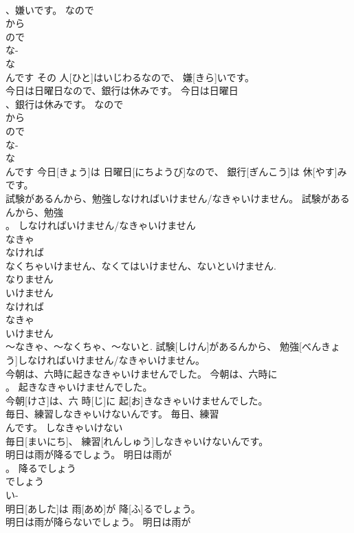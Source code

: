 \documentclass[8pt]{extreport}
\begin{document}
\begin{CJK}{UTF8}{min}
\\	、嫌いです。	なので	
\\	から	
\\	ので 
\\	な-
\\	な 
\\	んです	その 人[ひと]はいじわるなので、 嫌[きら]いです。	
\\	今日は日曜日なので、銀行は休みです。	今日は日曜日
\\	、銀行は休みです。	なので	
\\	から	
\\	ので 
\\	な-
\\	な 
\\	んです	今日[きょう]は 日曜日[にちようび]なので、 銀行[ぎんこう]は 休[やす]みです。	
\\	試験があるんから、勉強しなければいけません/なきゃいけません。	試験があるんから、勉強
\\	。	しなければいけません/なきゃいけません	
\\	なきゃ 
\\	なければ 
\\	なくちゃいけません、なくてはいけません、ないといけません. 
\\	なりません 
\\	いけません 
\\	なければ 
\\	なきゃ 
\\	いけません 
\\	～なきゃ、～なくちゃ、～ないと.	試験[しけん]があるんから、 勉強[べんきょう]しなければいけません/なきゃいけません。	
\\	今朝は、六時に起きなきゃいけませんでした。	今朝は、六時に
\\	。	起きなきゃいけませんでした。	
\\	今朝[けさ]は、六 時[じ]に 起[お]きなきゃいけませんでした。	
\\	毎日、練習しなきゃいけないんです。	毎日、練習
\\	んです。	しなきゃいけない	
\\	毎日[まいにち]、 練習[れんしゅう]しなきゃいけないんです。	
\\	明日は雨が降るでしょう。	明日は雨が
\\	。	降るでしょう	
\\	でしょう 
\\	い-
\\	明日[あした]は 雨[あめ]が 降[ふ]るでしょう。	
\\	明日は雨が降らないでしょう。	明日は雨が

\end{CJK}
\end{document}
